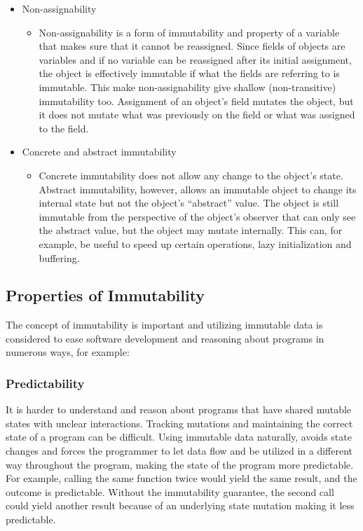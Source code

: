\documentclass[12pt,twoside]{article}
\begin{document}
\begin{itemize}
\item Non-assignability
     \begin{itemize}
    \item[] Non-assignability is a form of immutability and property of a variable that makes sure that it cannot be reassigned. Since fields of objects are variables and if no variable can be reassigned after its initial assignment, the object is effectively immutable if what the fields are referring to is immutable. This make non-assignability give shallow (non-transitive) immutability too. Assignment of an object’s field mutates the object, but it does not mutate what was previously on the field or what was assigned to the field.
\end{itemize}


\item Concrete and abstract immutability
     \begin{itemize}
    \item[] Concrete immutability does not allow any change to the object’s state. Abstract immutability, however, allows an immutable object to change its internal state but not the object’s “abstract” value. The object is still immutable from the perspective of the object’s observer that can only see the abstract value, but the object may mutate internally. This can, for example, be useful to speed up certain operations, lazy initialization and buffering.
\end{itemize}


\end{itemize}

\subsection{Properties of Immutability}
The concept of immutability is important and
utilizing immutable data is considered to ease software development and reasoning about programs in
numerous ways, for example:

\subsubsection{Predictability} It is harder to understand and reason about programs that have shared mutable
states with unclear interactions. Tracking mutations and maintaining the correct state of a program
can be difficult. Using immutable data naturally, avoids state changes and forces the programmer
to let data flow and be utilized in a different way throughout the program, making the state of the
program more predictable. For example, calling the same function twice would yield the same result,
and the outcome is predictable. Without the immutability guarantee, the second call could
yield another result because of an underlying state mutation making it less predictable.
\end{document}
